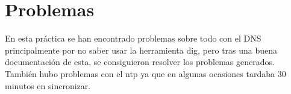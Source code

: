 \documentclass{article}
\begin{document}
\section{Problemas}
En esta práctica se han encontrado problemas sobre todo con el DNS principalmente por no saber usar la herramienta dig, pero tras una buena documentación de esta, se consiguieron resolver los problemas generados. \\
También hubo problemas con el ntp ya que en algunas ocasiones tardaba 30 minutos en sincronizar.
\end{document}

